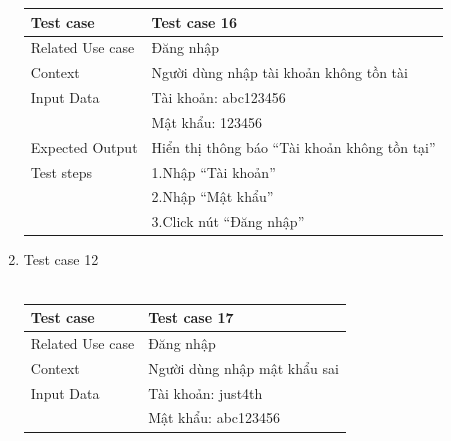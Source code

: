 \documentclass[a4paper, 12pt]{article}
\begin{document}
\begin{enumerate}
		\begin{tabular}{|l|l|}
			\hline
			Test case&
			Test case 16\\
			\hline
			Related Use case&
			Đăng nhập\\
			\hline
			Context&
			Người dùng nhập tài khoản không tồn tài\\
			\hline
			Input Data&
			Tài khoản: abc123456\\&
			Mật khẩu: 123456\\
			\hline
			Expected Output&
			Hiển thị thông báo “Tài khoản không tồn tại”\\
			\hline
			Test steps&
			1.Nhập “Tài khoản”\\&
			2.Nhập “Mật khẩu”\\&
			3.Click nút “Đăng nhập”\\							
			\hline
		\end{tabular}
		\item Test case 12\\\\
		\begin{tabular}{|l|l|}
			\hline
			Test case&
			Test case 17\\
			\hline
			Related Use case&
			Đăng nhập\\
			\hline
			Context&
			Người dùng nhập mật khẩu sai\\
			\hline
			Input Data&
			Tài khoản: just4th\\&
			Mật khẩu: abc123456\\
			

\end{tabular}
\end{enumerate}
\end{document}
